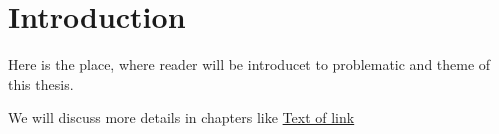 \chapter*{Introduction}\label{chap:intro}

\pagestyle{plain}


Here is the place, where reader will be introducet to problematic and theme of this thesis.

We will discuss more details in chapters like  \hyperref[chap:databinding]{Text of link} 
